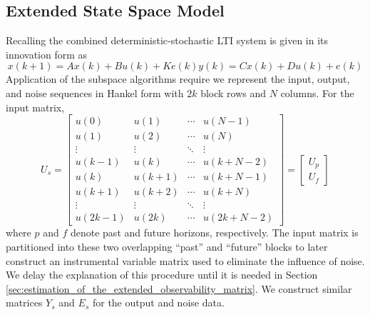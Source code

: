 \subsection{Extended State Space Model}\label{sec:extended_state_space_model}
Recalling the combined deterministic-stochastic LTI system is given in its innovation form as
\begin{subequations}\label{eq:3_innovation}
\begin{equation}x(k+1) = Ax(k) + Bu(k) + Ke(k)\end{equation}
\begin{equation}y(k) = Cx(k) + Du(k) + e(k)\end{equation}
\end{subequations}
Application of the subspace algorithms require we represent the input, output, and noise sequences in Hankel form with $2k$ block rows and $N$ columns. For the input matrix,
\begin{equation}\label{eq:3_input}
U_s = \begin{bmatrix}
u(0) & u(1) & \cdots & u(N-1)\\
u(1) & u(2) & \cdots & u(N)\\
\vdots & \vdots & \ddots & \vdots\\
u(k-1) & u(k) & \cdots & u(k+N-2)\\
\hline
u(k) & u(k+1) & \cdots & u(k+N-1)\\
u(k+1) & u(k+2) & \cdots & u(k+N)\\
\vdots & \vdots & \ddots & \vdots\\
u(2k-1) & u(2k) & \cdots & u(2k+N-2)
\end{bmatrix} = 
\begin{bmatrix} U_p\\ \hline U_f\end{bmatrix}
\end{equation}
where $p$ and $f$ denote past and future horizons, respectively. The input matrix is partitioned into these two overlapping ``past'' and ``future'' blocks to later construct an instrumental variable matrix used to eliminate the influence of noise. We delay the explanation of this procedure until it is needed in Section \ref{sec:estimation_of_the_extended_observability_matrix}. We construct similar matrices $Y_s$ and $E_s$ for the output and noise data.

